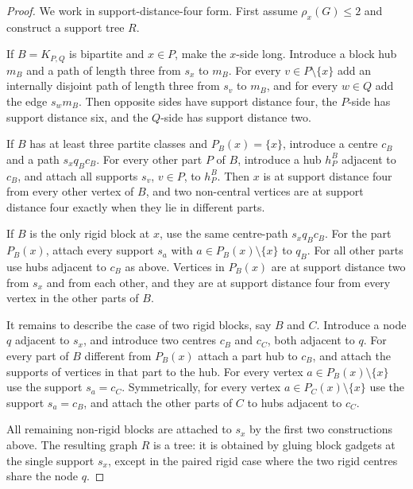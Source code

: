 \documentclass[11pt]{article}
\theoremstyle{definition}
\begin{document}
\begin{proof}
We work in support-distance-four form.  First assume $\rho_x(G)\le2$ and construct a support tree $R$.

If $B=K_{P,Q}$ is bipartite and $x\in P$, make the $x$-side long.  Introduce a block hub $m_B$ and a path of length three from $s_x$ to $m_B$.  For every $v\in P\setminus\{x\}$ add an internally disjoint path of length three from $s_v$ to $m_B$, and for every $w\in Q$ add the edge $s_wm_B$.  Then opposite sides have support distance four, the $P$-side has support distance six, and the $Q$-side has support distance two.

If $B$ has at least three partite classes and $P_B(x)=\{x\}$, introduce a centre $c_B$ and a path $s_xq_Bc_B$.  For every other part $P$ of $B$, introduce a hub $h^B_P$ adjacent to $c_B$, and attach all supports $s_v$, $v\in P$, to $h^B_P$.  Then $x$ is at support distance four from every other vertex of $B$, and two non-central vertices are at support distance four exactly when they lie in different parts.

If $B$ is the only rigid block at $x$, use the same centre-path $s_xq_Bc_B$.  For the part $P_B(x)$, attach every support $s_a$ with $a\in P_B(x)\setminus\{x\}$ to $q_B$.  For all other parts use hubs adjacent to $c_B$ as above.  Vertices in $P_B(x)$ are at support distance two from $s_x$ and from each other, and they are at support distance four from every vertex in the other parts of $B$.

It remains to describe the case of two rigid blocks, say $B$ and $C$.  Introduce a node $q$ adjacent to $s_x$, and introduce two centres $c_B$ and $c_C$, both adjacent to $q$.  For every part of $B$ different from $P_B(x)$ attach a part hub to $c_B$, and attach the supports of vertices in that part to the hub.  For every vertex $a\in P_B(x)\setminus\{x\}$ use the support $s_a=c_C$.  Symmetrically, for every vertex $a\in P_C(x)\setminus\{x\}$ use the support $s_a=c_B$, and attach the other parts of $C$ to hubs adjacent to $c_C$.

All remaining non-rigid blocks are attached to $s_x$ by the first two constructions above.  The resulting graph $R$ is a tree: it is obtained by gluing block gadgets at the single support $s_x$, except in the paired rigid case where the two rigid centres share the node $q$.


\end{proof}
\end{document}

